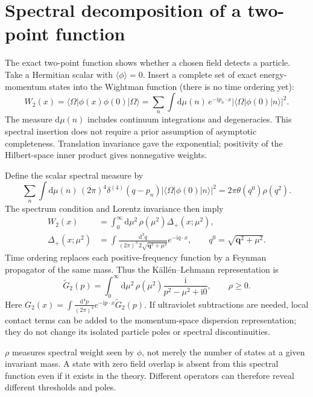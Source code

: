 \documentclass[11pt]{article}
\newcommand{\dd}{\mathrm d}
\newcommand{\ii}{\mathrm i}
\newcommand{\ket}[1]{\lvert#1\rangle}
\newcommand{\bra}[1]{\langle#1\rvert}
\newcommand{\intp}{\int\!\frac{\dd^4p}{(2\pi)^4}}
\newcommand{\module}[1]{\clearpage\section{#1}}
\begin{document}
\module{Spectral decomposition of a two-point function}
The exact two-point function shows whether a chosen field detects a
particle. Take a Hermitian scalar with \(\langle\phi\rangle=0\).
Insert a complete set of exact energy-momentum states into the Wightman
function (there is no time ordering yet):
\begin{equation}
 W_2(x)=\bra{\Omega}\phi(x)\phi(0)\ket{\Omega}
 =\sum_n\int\dd\mu(n)\,e^{-\ii p_n\cdot x}
 |\bra{\Omega}\phi(0)\ket{n}|^2.
 \label{eq:wightman}
\end{equation}
The measure \(\dd\mu(n)\) includes continuum integrations and degeneracies.
This spectral insertion does not require a prior assumption of asymptotic
completeness. Translation invariance gave the exponential; positivity of
the Hilbert-space inner product gives nonnegative weights.

Define the scalar spectral measure by
\begin{equation}
 \sum_n\int\dd\mu(n)\,(2\pi)^4\delta^{(4)}(q-p_n)
 |\bra{\Omega}\phi(0)\ket{n}|^2
 =2\pi\theta(q^0)\rho(q^2).
 \label{eq:rhodef}
\end{equation}
The spectrum condition and Lorentz invariance then imply
\begin{align}
 W_2(x)&=\int_0^\infty\dd\mu^2\,\rho(\mu^2)\Delta_+(x;\mu^2),\\
 \Delta_+(x;\mu^2)&=\int\frac{\dd^3q}{(2\pi)^3\,2\sqrt{\bm q^2+\mu^2}}
 e^{-\ii q\cdot x},\qquad q^0=\sqrt{\bm q^2+\mu^2}.
\end{align}
Time ordering replaces each positive-frequency function by a Feynman
propagator of the same mass. Thus the K\"all\'en--Lehmann representation is
\begin{equation}
 \boxed{\quad \widetilde G_2(p)=\int_0^\infty\dd\mu^2\,
 \rho(\mu^2)\frac{\ii}{p^2-\mu^2+\ii0},\qquad \rho\geq0.\quad}
 \label{eq:KL}
\end{equation}
Here \(G_2(x)=\intp e^{-\ii p\cdot x}\widetilde G_2(p)\).
If ultraviolet subtractions are needed, local contact terms can be added
to the momentum-space dispersion representation; they do not change its
isolated particle poles or spectral discontinuities.

\begin{keyidea}
\(\rho\) measures spectral weight seen by \(\phi\), not merely the number
of states at a given invariant mass. A state with zero field overlap is
absent from this spectral function even if it exists in the theory.
Different operators can therefore reveal different thresholds and poles.
\end{keyidea}
\end{document}
